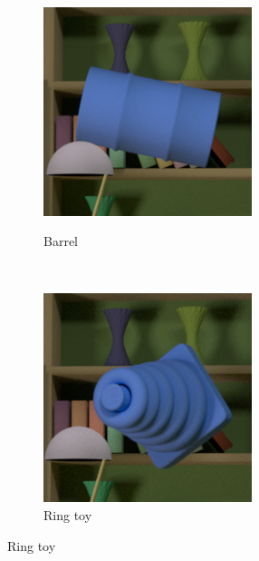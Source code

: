 \documentclass{jov}
\begin{document}
\begin{figure}
\begin{subfigure}[b]{0.14 \textwidth}
        \label{fig:libraryWithXylophone}
    \end{subfigure}
     ~ 
    \begin{subfigure}[b]{0.14 \textwidth}
        \caption{Barrel}
        \includegraphics[width=\textwidth]{../FiguresDraft5/Figure3/Figure3_c.png}
        \label{fig:libraryWithBarrel}
         \end{subfigure}
    ~
	\begin{subfigure}[b]{0.14 \textwidth}
        \caption{Ring toy}
        \includegraphics[width=\textwidth]{../FiguresDraft5/Figure3/Figure3_d.png}

\end{subfigure}
\end{figure}
\end{document}
